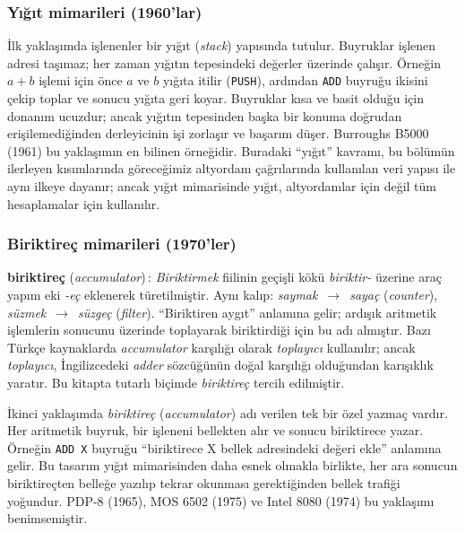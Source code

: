 \subsubsection*{Yığıt mimarileri (1960'lar)}
İlk yaklaşımda işlenenler bir yığıt (\emph{stack}) yapısında tutulur. Buyruklar işlenen adresi taşımaz; her zaman yığıtın tepesindeki değerler üzerinde çalışır. Örneğin $a + b$ işlemi için önce $a$ ve $b$ yığıta itilir (\texttt{PUSH}), ardından \texttt{ADD} buyruğu ikisini çekip toplar ve sonucu yığıta geri koyar. Buyruklar kısa ve basit olduğu için donanım ucuzdur; ancak yığıtın tepesinden başka bir konuma doğrudan erişilemediğinden derleyicinin işi zorlaşır ve başarım düşer. Burroughs B5000 (1961) bu yaklaşımın en bilinen örneğidir. Buradaki ``yığıt'' kavramı, bu bölümün ilerleyen kısımlarında göreceğimiz altyordam çağrılarında kullanılan veri yapısı ile aynı ilkeye dayanır; ancak yığıt mimarisinde yığıt, altyordamlar için değil tüm hesaplamalar için kullanılır.

\subsubsection*{Biriktireç mimarileri (1970'ler)}

\begin{terimnotu}
\textbf{biriktireç} (\emph{accumulator})\,: \emph{Biriktirmek} fiilinin geçişli kökü \emph{biriktir-} üzerine araç yapım eki \emph{-eç} eklenerek türetilmiştir. Aynı kalıp: \emph{saymak}~$\to$~\emph{sayaç} (\emph{counter}), \emph{süzmek}~$\to$~\emph{süzgeç} (\emph{filter}). ``Biriktiren aygıt'' anlamına gelir; ardışık aritmetik işlemlerin sonucunu üzerinde toplayarak biriktirdiği için bu adı almıştır. Bazı Türkçe kaynaklarda \emph{accumulator} karşılığı olarak \emph{toplayıcı} kullanılır; ancak \emph{toplayıcı}, İngilizcedeki \emph{adder} sözcüğünün doğal karşılığı olduğundan karışıklık yaratır. Bu kitapta tutarlı biçimde \emph{biriktireç} tercih edilmiştir.
\end{terimnotu}

İkinci yaklaşımda \emph{biriktireç} (\emph{accumulator}) adı verilen tek bir özel yazmaç vardır. Her aritmetik buyruk, bir işleneni bellekten alır ve sonucu biriktirece yazar. Örneğin \texttt{ADD X} buyruğu ``biriktirece X bellek adresindeki değeri ekle'' anlamına gelir. Bu tasarım yığıt mimarisinden daha esnek olmakla birlikte, her ara sonucun biriktireçten belleğe yazılıp tekrar okunması gerektiğinden bellek trafiği yoğundur. PDP-8 (1965), MOS 6502 (1975) ve Intel 8080 (1974) bu yaklaşımı benimsemiştir.


